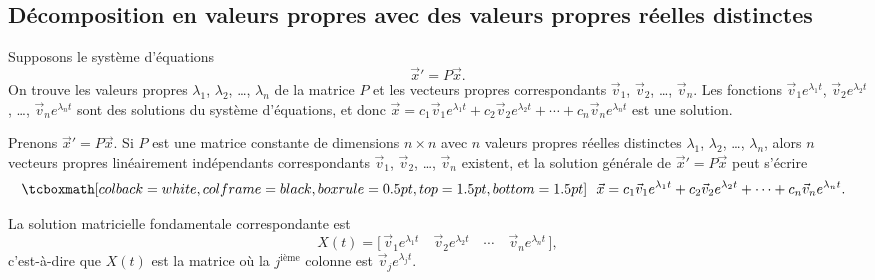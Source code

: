 \subsection{Décomposition en valeurs propres avec des valeurs propres réelles distinctes}

Supposons le système d'équations
\begin{equation*}
{\vec{x}}' = P\vec{x} .
\end{equation*}
On trouve les valeurs propres $\lambda_1$, $\lambda_2$, \ldots, $\lambda_n$
de la matrice $P$ et les vecteurs propres correspondants
$\vec{v}_1$, $\vec{v}_2$, \ldots, $\vec{v}_n$.
Les fonctions
$\vec{v}_1 e^{\lambda_1 t}$, 
$\vec{v}_2 e^{\lambda_2 t}$, \ldots,
$\vec{v}_n e^{\lambda_n t}$ sont des solutions du système d'équations, et donc
$
\vec{x} = c_1 \vec{v}_1 e^{\lambda_1 t} +
c_2 \vec{v}_2 e^{\lambda_2 t} + \cdots +
c_n \vec{v}_n e^{\lambda_n t}
$
est une solution.

\begin{theorem}
Prenons ${\vec{x}}' = P\vec{x}$. Si $P$ est une matrice constante de dimensions $n \times n$ avec $n$ valeurs propres réelles distinctes $\lambda_1$, $\lambda_2$, \ldots, $\lambda_n$,
alors $n$ vecteurs propres linéairement indépendants correspondants
$\vec{v}_1$, $\vec{v}_2$, \ldots, $\vec{v}_n$ existent, et la solution générale de
${\vec{x}}' = P\vec{x}$
peut s'écrire
\begin{equation*}
\mybxbg{~~
\vec{x} = c_1 \vec{v}_1 e^{\lambda_1 t} +
c_2 \vec{v}_2 e^{\lambda_2 t} + \cdots +
c_n \vec{v}_n e^{\lambda_n t} .
~~}
\end{equation*}
\end{theorem}

La solution matricielle fondamentale correspondante est
\begin{equation*}
X(t) = \bigl[\, \vec{v}_1 e^{\lambda_1 t} \quad \vec{v}_2 e^{\lambda_2 t}
\quad \cdots \quad \vec{v}_n e^{\lambda_n t} \,\bigr],
\end{equation*}
c'est-à-dire que $X(t)$
est la matrice où la $j^{\text{ième}}$ colonne est
$\vec{v}_j e^{\lambda_j t}$.

